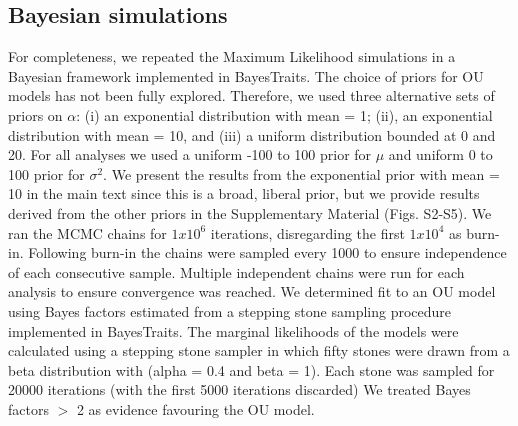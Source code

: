   \subsection{Bayesian simulations} %
    For completeness, we repeated the Maximum Likelihood simulations in a Bayesian framework implemented in BayesTraits. 
    The choice of priors for OU models has not been fully explored. 
    Therefore, we used three alternative sets of priors on $\alpha$: (i) an exponential distribution with mean = 1; (ii), an exponential distribution with mean = 10, and (iii) a uniform distribution bounded at 0 and 20. 
    For all analyses we used a uniform -100 to 100 prior for $\mu$ and uniform 0 to 100 prior for $\sigma^2$. 
    We present the results from the exponential prior with mean = 10 in the main text since this is a broad, liberal prior, but we provide results derived from the other priors in the Supplementary Material (Figs. S2-S5). %
    We ran the MCMC chains for $1x10^6$ iterations, disregarding the first $1x10^4$ as burn-in. 
    Following burn-in the chains were sampled every 1000 to ensure independence of each consecutive sample. 
    Multiple independent chains were run for each analysis to ensure convergence was reached. 
    We determined fit to an OU model using Bayes factors estimated from a stepping stone sampling procedure \citep{xie2010improving}implemented in BayesTraits. 
    The marginal likelihoods of the models were calculated using a stepping stone sampler in which fifty stones were drawn from a beta distribution with (alpha = 0.4 and beta = 1). 
    Each stone was sampled for 20000 iterations (with the first 5000 iterations discarded) 
    We treated Bayes factors $>$ 2 as evidence favouring the OU model. 

